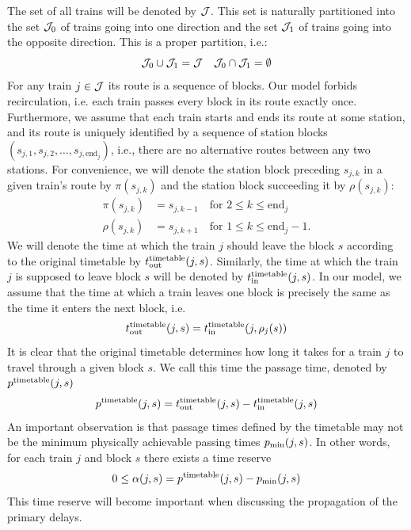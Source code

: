 The set of all trains will be denoted by $\mathcal{J}$. This set is naturally
partitioned into the set $\mathcal{J}_0$ of trains going into one direction and the set
$\mathcal{J}_1$ of trains going into the opposite direction. This is a proper
partition, i.e.:
\begin{equation}
  \mathcal{J}_0 \cup \mathcal{J}_1 = \mathcal{J} \quad \mathcal{J}_0 \cap \mathcal{J}_1 = \emptyset
\end{equation}
For any train $j \in \mathcal{J}$ its route is a sequence of blocks. Our model forbids
recirculation, i.e. each train passes every block in its route exactly once.
Furthermore, we assume that each train starts and ends its route at some
station, and its route is uniquely identified by a sequence of station blocks
$\left(s_{j,1}, s_{j, 2}, \ldots, s_{j, \text{end}_j}\right)$, i.e., there are
no alternative routes between any two stations. For convenience, we will denote
the station block preceding $s_{j,k}$ in a given train's route by
$\pi(s_{j,k})$ and the station block succeeding it by $\rho(s_{j,k})$:
\begin{align}
  \pi(s_{j,k})  & = s_{j,k-1} \quad \mbox{for } 2 \le k \le \mbox{end}_j      \\
  \rho(s_{j,k}) & = s_{j,k+1} \quad \mbox{for } 1 \le k \le \mbox{end}_j - 1.
\end{align}
We will denote the time at which the train $j$ should leave the block $s$
according to the original timetable by $t_\text{out}^\text{timetable}(j, s)$. Similarly, the time at
which the train $j$ is supposed to leave block $s$ will be denoted by $t_\text{in}^\text{timetable}(j,
  s)$. In our model, we assume that the time at which a train leaves one block is
precisely the same as the time it enters the next block, i.e.
\begin{equation}
  t_\text{out}^\text{timetable}(j, s) = t_\text{in}^\text{timetable}(j, \rho_j(s))
\end{equation}
It is clear that the original timetable determines how long it takes for a
train $j$ to travel through a given block $s$. We call this time the passage
time, denoted by $p^\text{timetable}(j, s)$
\begin{equation}
  p^\text{timetable}(j, s) = t_\text{out}^\text{timetable}(j, s) - t_\text{in}^\text{timetable}(j, s)
\end{equation}
An important observation is that passage times defined by the timetable may not
be the minimum physically achievable passing times $p_\text{min}(j, s)$. In other
words, for each train $j$ and block $s$ there exists a time reserve
\begin{equation}
  \label{eq:pt}
  0 \le \alpha(j, s) = p^\text{timetable}(j, s) - p_\text{min}(j, s)
\end{equation}
This time reserve will become important when discussing the propagation of the
primary delays.

